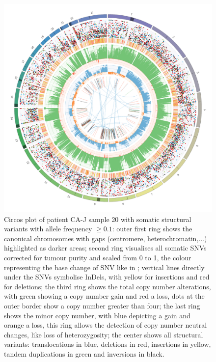 \begin{figure}[ht]
\centering
\includegraphics[width=.99\linewidth]{Figures/CASCADE/CA80/CA80-20.circos.png}
\caption[Circos plot of patient CA-J sample 20]{Circos plot of patient CA-J sample 20 with somatic structural variants with allele frequency $\geq 0.1$: outer first ring shows the canonical chromosomes with gaps (centromere, heterochromatin,...) highlighted as darker areas; second ring visualises all somatic SNVs corrected for tumour purity and scaled from 0 to 1, the colour representing the base change of SNV like in \protect\textcite{Alexandrov2013}; vertical lines directly under the SNVs symbolise InDels, with yellow for insertions and red for deletions; the third ring shows the total copy number alterations, with green showing a copy number gain and red a loss, dots at the outer border show a copy number greater than four; the last ring shows the minor copy number, with blue depicting a gain and orange a loss, this ring allows the detection of copy number neutral changes, like loss of heterozygosity; the center shows all structural variants: translocations in blue, deletions in red, insertions in yellow, tandem duplications in green and inversions in black.} \label{fig:ca80.20circos}
\end{figure}


